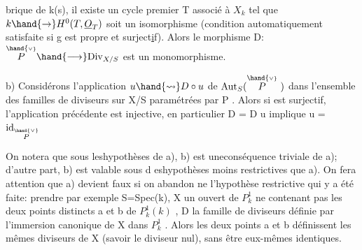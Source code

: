 brique de k(s), il existe un cycle premier T associé à $X_k$ tel que
$k \hand{\to} H^0(T,\underline{O}_T)$ soit un isomorphisme (condition automatiquement satisfaite
si g est propre et surject\uline{i}f). Alors le morphisme D: $\overset{\hand{\scriptscriptstyle\vee}}{P} \hand{\longrightarrow} \mathrm{Div}_{X/S}$ est
un monomorphisme.

b)  Considérons l'application $u \hand{\rightsquigarrow} D\circ u$ de
$\mathrm{Aut}_S(\overset{\hand{\scriptscriptstyle\vee}}{P}\ )$ dans l'ensemble des familles de diviseurs sur X/S paramétrées
par P . Alors si  est surjectif, l'application précédente est injective,
en particulier D = D u implique u = $\mathrm{id}_{\overset{\hand{\scriptscriptstyle\vee}}{P}}$

On notera que sous leshypothèses de a), b) est uneconséquence
triviale de a); d'autre part, b) est valable sous d eshypothèses moins
restrictives que a). On fera attention que a) devient faux si on abandon
ne l'hypothèse restrictive qui y a  été faite: prendre par exemple
S=Spec(k), X un ouvert de $P^1_k$ ne contenant pas les deux points distincts
a et b de $P^1_k(k)$ , D la famille de diviseurs définie par l'immersion
canonique de X dans $P^1_k$ . Alors les deux  points a et b
définissent les mêmes diviseurs de X (savoir le diviseur nul), sans être
eux-mêmes identiques.

